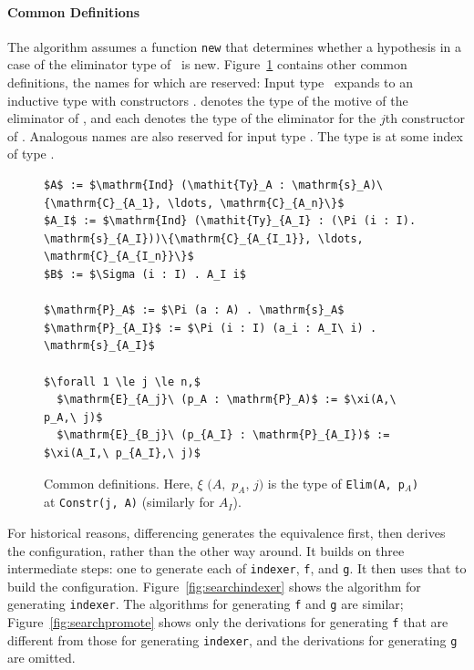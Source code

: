 
\paragraph{Common Definitions}
The algorithm assumes a function \lstinline{new} that determines whether a hypothesis in a case of the eliminator type of \AI\ is new.
Figure~\ref{fig:common} contains other common definitions, the names for which are reserved:
Input type \Aa\ expands to an inductive type with constructors
.
 denotes the type of the motive of the eliminator of \Aa,
and each  denotes the type of the eliminator for the $j$th constructor of \Aa.
Analogous names are also reserved for input type \AI.
The type \B is \AI at some index of type \I.

\begin{figure}
\begin{lstlisting}
$A$ := $\mathrm{Ind} (\mathit{Ty}_A : \mathrm{s}_A)\{\mathrm{C}_{A_1}, \ldots, \mathrm{C}_{A_n}\}$
$A_I$ := $\mathrm{Ind} (\mathit{Ty}_{A_I} : (\Pi (i : I). \mathrm{s}_{A_I}))\{\mathrm{C}_{A_{I_1}}, \ldots, \mathrm{C}_{A_{I_n}}\}$
$B$ := $\Sigma (i : I) . A_I i$

$\mathrm{P}_A$ := $\Pi (a : A) . \mathrm{s}_A$
$\mathrm{P}_{A_I}$ := $\Pi (i : I) (a_i : A_I\ i) . \mathrm{s}_{A_I}$

$\forall 1 \le j \le n,$
  $\mathrm{E}_{A_j}\ (p_A : \mathrm{P}_A)$ := $\xi(A,\ p_A,\ j)$
  $\mathrm{E}_{B_j}\ (p_{A_I} : \mathrm{P}_{A_I})$ := $\xi(A_I,\ p_{A_I},\ j)$
\end{lstlisting}
\caption{Common definitions. Here, $\xi$ $(A,$ $p_A$, $j)$ is the type 
of \lstinline{Elim(A, p}$_A$\lstinline{)} at \lstinline{Constr(j, A)} (similarly for $A_I$).}
\label{fig:common}
\end{figure}

For historical reasons, differencing generates the equivalence first, then derives the configuration, rather than the other way around. %
It builds on three intermediate steps: one to generate each of \lstinline{indexer},
\lstinline{f}, and \lstinline{g}.
It then uses that to build the configuration.
Figure~\ref{fig:searchindexer} shows the algorithm for generating \lstinline{indexer}.
The algorithms for generating \lstinline{f} and \lstinline{g} are similar;
Figure~\ref{fig:searchpromote} shows only the derivations for generating \lstinline{f}
that are different from those for generating \lstinline{indexer}, and 
the derivations for generating \lstinline{g} are omitted.

